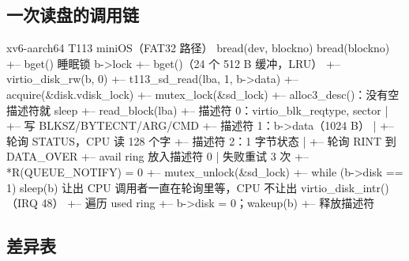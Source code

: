 \subsection{一次读盘的调用链}

\begin{txtcode}
xv6-aarch64                                      T113 miniOS（FAT32 路径）
bread(dev, blockno)                              bread(blockno)
+-- bget()  睡眠锁 b->lock                        +-- bget()（24 个 512 B 缓冲，LRU）
+-- virtio_disk_rw(b, 0)                          +-- t113_sd_read(lba, 1, b->data)
    +-- acquire(&disk.vdisk_lock)                     +-- mutex_lock(&sd_lock)
    +-- alloc3_desc()：没有空描述符就 sleep           +-- read_block(lba)
    +-- 描述符 0：virtio_blk_req{type, sector}        |   +-- 写 BLKSZ/BYTECNT/ARG/CMD
    +-- 描述符 1：b->data（1024 B）                   |   +-- 轮询 STATUS，CPU 读 128 个字
    +-- 描述符 2：1 字节状态                          |   +-- 轮询 RINT 到 DATA_OVER
    +-- avail ring 放入描述符 0                       |   失败重试 3 次
    +-- *R(QUEUE_NOTIFY) = 0                          +-- mutex_unlock(&sd_lock)
    +-- while (b->disk == 1) sleep(b)  让出 CPU   调用者一直在轮询里等，CPU 不让出
virtio_disk_intr()（IRQ 48）
+-- 遍历 used ring
+-- b->disk = 0；wakeup(b)
+-- 释放描述符
\end{txtcode}

\subsection{差异表}

